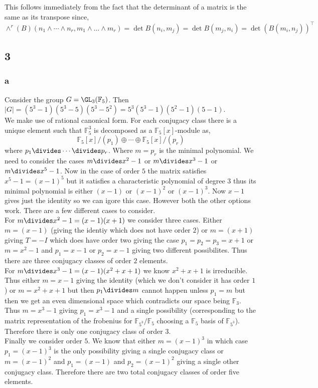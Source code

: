 \documentclass[12pt]{article}
\renewcommand{\F}{\mathbb{F}}
\begin{document}
This follows immediately from the fact that the determinant of a matrix is the same as its transpose since,
\[ \wedge^r(B)(n_1 \wedge \cdots \wedge n_r, m_1 \wedge \dots \wedge m_r) = \det{B(n_i, m_j)} = \det{B(m_j, n_i)} = \det{(B(m_i, n_j))^\top} \]


\subsection{3}

\subsubsection{a}

Consider the group $G = \GL_{3}(\F_5)$. Then $|G| = (5^3 - 1)(5^3 - 5)(5^3 - 5^2) = 5^3 (5^3 - 1)(5^2 - 1)(5 - 1)$.  
\bigskip\\
We make use of rational canonical form. For each conjugacy class there is a unique element such that $\F_5^3$ is decomposed as a $\F_5[x]$-module as,
\[ \F_5[x]/(p_1) \oplus \cdots \oplus \F_5[x]/(p_r) \]
where $p_1 \divides \cdots \divides p_r$. 
Where $m = p_r$ is the minimal polynomial. We need to consider the cases $m \divides x^2 - 1$ or $m \divides x^3 - 1$ or $m \divides x^5 - 1$. Now in the case of order $5$ the matrix satisfies $x^5 - 1 = (x - 1)^5$ but it satisfies a characteristic polynomial of degree $3$ thus its minimal polynomial is either $(x - 1)$ or $(x - 1)^2$ or $(x - 1)^3$. Now $x - 1$ gives just the identity so we can igore this case. However both the other options work. There are a few different cases to consider.
\bigskip\\
For $m \divides x^2 - 1 = (x - 1)(x + 1)$ we consider three cases. Either $m = (x - 1)$ (giving the identiy which does not have order $2$) or $m = (x + 1)$ giving $T = -I$ which does have order two giving the case $p_1 = p_2 = p_3 = x + 1$ or $m = x^2 - 1$ and $p_1 = x - 1$ or $p_2 = x - 1$ giving two different possibilites. Thus there are three conjugacy classes of order $2$ elements.
\bigskip\\
For $m \divides x^3 - 1 = (x - 1)(x^2 + x + 1)$ we know $x^2 + x + 1$ is irreducible. Thus either $m = x - 1$ giving the identity (which we don't consider it has order $1$) or $m = x^2 + x + 1$ but then $p_1 \divides m$ cannot happen unless $p_1 = m$ but then we get an even dimensional space which contradicts our space being $\F_3$. Thus $m = x^3 - 1$ giving $p_1 = x^3 - 1$ and a single possibility (corresponding to the matrix representation of the frobenius for $\F_{5^3} / \F_5$ choosing a $\F_5$ basis of $\F_{5^3}$). Therefore there is only one conjugacy class of order $3$.
\bigskip\\
Finally we consider order $5$. We know that either $m = (x - 1)^3$ in which case $p_1 = (x - 1)^3$ is the only possibility giving a single conjugacy class or $m = (x - 1)^2$ and $p_1 = (x-1)$ and $p_2 = (x-1)^2$ giving a single other conjugacy class. Therefore there are two total conjugacy classes of order five elements.
\end{document}
